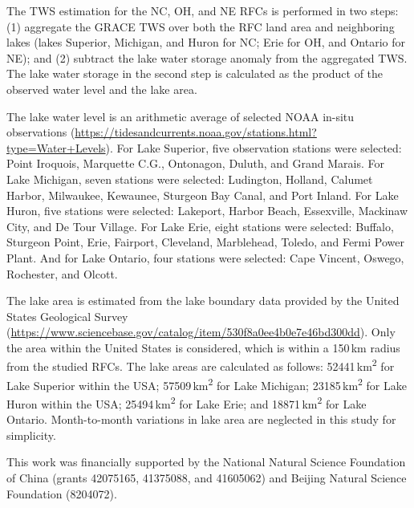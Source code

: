 \documentclass[essd, manuscript]{copernicus}
\begin{document}
The TWS estimation for the NC, OH, and NE RFCs is performed in two steps: (1) aggregate the GRACE TWS over both the RFC land area and neighboring lakes (lakes Superior, Michigan, and Huron for NC\@; Erie for OH, and Ontario for NE); and (2) subtract the lake water storage anomaly from the aggregated TWS\@. The lake water storage in the second step is calculated as the product of the observed water level and the lake area.

The lake water level is an arithmetic average of selected NOAA in-situ observations (\url{https://tidesandcurrents.noaa.gov/stations.html?type=Water+Levels}). For Lake Superior, five observation stations were selected: Point Iroquois, Marquette C.G., Ontonagon, Duluth, and Grand Marais. For Lake Michigan, seven stations were selected: Ludington, Holland, Calumet Harbor, Milwaukee, Kewaunee, Sturgeon Bay Canal, and Port Inland. For Lake Huron, five stations were selected: Lakeport, Harbor Beach, Essexville, Mackinaw City, and De Tour Village. For Lake Erie, eight stations were selected: Buffalo, Sturgeon Point, Erie, Fairport, Cleveland, Marblehead, Toledo, and Fermi Power Plant. And for Lake Ontario, four stations were selected: Cape Vincent, Oswego, Rochester, and Olcott.

The lake area is estimated from the lake boundary data provided by the United States Geological Survey (\url{https://www.sciencebase.gov/catalog/item/530f8a0ee4b0e7e46bd300dd}). Only the area within the United States is considered, which is within a 150\,km radius from the studied RFCs. The lake areas are calculated as follows: 52441\,km\textsuperscript{2} for Lake Superior within the USA\@; 57509\,km\textsuperscript{2} for Lake Michigan; 23185\,km\textsuperscript{2} for Lake Huron within the USA\@; 25494\,km\textsuperscript{2} for Lake Erie; and 18871\,km\textsuperscript{2} for Lake Ontario. Month-to-month variations in lake area are neglected in this study for simplicity.

\noappendix

\label{sec:contribution}



\begin{acknowledgements}
This work was financially supported by the National Natural Science Foundation of China (grants 42075165, 41375088, and 41605062) and Beijing Natural Science Foundation (8204072).
\end{acknowledgements}



\end{document}
